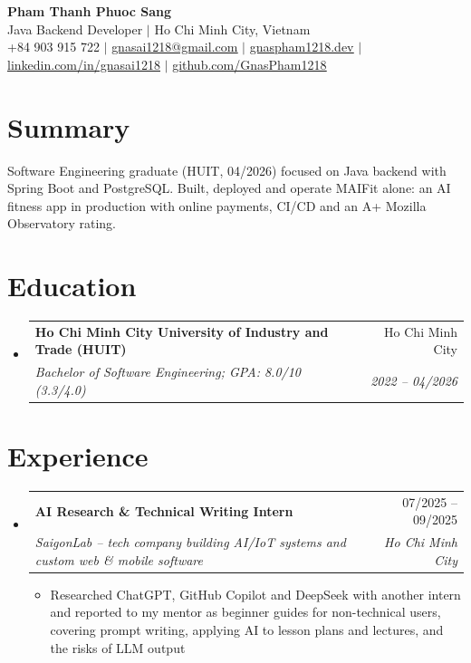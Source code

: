 \documentclass[letterpaper,11pt]{article}
\makeatletter
\newcommand{\resumeItem}[1]{\item\small{{#1 \vspace{-2pt}}}}
\newcommand{\resumeSubheading}[4]{
  \vspace{-2pt}\item
    \begin{tabular*}{0.97\textwidth}[t]{l@{\extracolsep{\fill}}r}
      \textbf{#1} & #2 \\
      \textit{\small#3} & \textit{\small #4} \\
    \end{tabular*}\vspace{-7pt}
}
\newcommand{\resumeSubHeadingListStart}{\begin{itemize}[leftmargin=0.15in, label={}]}
\newcommand{\resumeSubHeadingListEnd}{\end{itemize}}
\newcommand{\resumeItemListStart}{\begin{itemize}}
\newcommand{\resumeItemListEnd}{\end{itemize}\vspace{-5pt}}
\newcommand{\link}[2]{\href{#1}{\underline{#2}}}
\makeatother
\begin{document}
\begin{center}
  \textbf{\Huge Pham Thanh Phuoc Sang} \\ \vspace{1pt}
  \small Java Backend Developer \quad $|$ \quad Ho Chi Minh City, Vietnam \\ \vspace{1pt}
  \small +84 903 915 722 $|$
  \link{mailto:gnasai1218@gmail.com}{gnasai1218@gmail.com} $|$
  \link{https://gnaspham1218.dev}{gnaspham1218.dev} $|$
  \link{https://www.linkedin.com/in/gnasai1218}{linkedin.com/in/gnasai1218} $|$
  \link{https://github.com/GnasPham1218}{github.com/GnasPham1218}
\end{center}

\section{Summary}
\small{Software Engineering graduate (HUIT, 04/2026) focused on Java backend with Spring Boot and PostgreSQL.
Built, deployed and operate MAIFit alone: an AI fitness app in production with online payments, CI/CD
and an A+ Mozilla Observatory rating.}

\section{Education}
\resumeSubHeadingListStart
  \resumeSubheading
    {Ho Chi Minh City University of Industry and Trade (HUIT)}{Ho Chi Minh City}
    {Bachelor of Software Engineering; GPA: 8.0/10 (3.3/4.0)}{2022 -- 04/2026}
\resumeSubHeadingListEnd

\section{Experience}
\resumeSubHeadingListStart
  \resumeSubheading
    {AI Research \& Technical Writing Intern}{07/2025 -- 09/2025}
    {SaigonLab -- tech company building AI/IoT systems and custom web \& mobile software}{Ho Chi Minh City}
    \resumeItemListStart
      \resumeItem{Researched ChatGPT, GitHub Copilot and DeepSeek with another intern and reported to my mentor as beginner
        guides for non-technical users, covering prompt writing, applying AI to lesson plans and lectures, and the risks of LLM output}
    \resumeItemListEnd
\resumeSubHeadingListEnd
\end{document}
